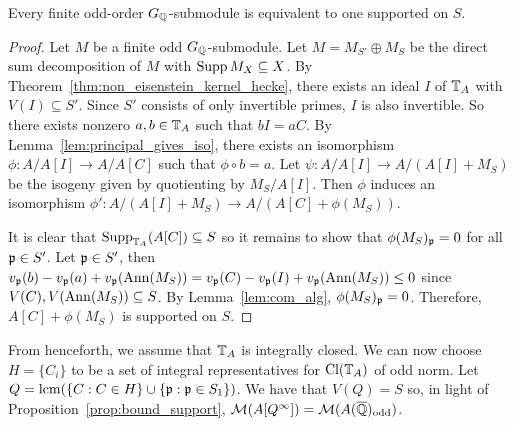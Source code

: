 \documentclass[thesis.tex]{subfiles}
\begin{document}
\begin{proposition}%
    \label{prop:bound_support}
    Every finite odd-order $G_{\mathbb{Q}}$-submodule is equivalent to one supported on
    $S$.
\end{proposition}
\begin{proof}
    Let $M$ be a finite odd $G_{\mathbb{Q}}$-submodule. Let $M=M_{S'}\oplus M_S$ be the
    direct sum decomposition of $M$ with $\operatorname{Supp} M_X \subseteq X$. By
    Theorem~\ref{thm:non_eisenstein_kernel_hecke}, there exists an ideal
    $I$ of $\mathbb{T}_A$ with $V(I)\subseteq S'$. Since $S'$ consists of only
    invertible primes, $I$ is also invertible. So there exists nonzero $a,b\in
    \mathbb{T}_A$ such that $bI=aC$. By Lemma~\ref{lem:principal_gives_iso}, there
    exists an isomorphism $\phi:A/A[I]\to A/A[C]$ such that $\phi\circ b = a$.
    Let $\psi:A/A[I]\to A/(A[I]+M_S)$ be the isogeny given by quotienting by
    $M_S/A[I]$. Then $\phi$ induces an isomorphism $\phi':A/(A[I]+M_S)\to
    A/(A[C]+\phi(M_S))$.

    It is clear that $\operatorname{Supp}_{\mathbb{T}_A}(A[C])\subseteq S$ so it remains to show
    that $\phi(M_S)_{\mathfrak{p}} =0$ for all $\mathfrak{p} \in S'$. Let $\mathfrak{p}\in S'$, then
    $v_{\mathfrak{p}}(b)-v_{\mathfrak{p}}(a)+v_{\mathfrak{p}}(\operatorname{Ann}(M_S))=v_{\mathfrak{p}}(C)-v_{\mathfrak{p}}(I)+v_{\mathfrak{p}}(\operatorname{Ann}(M_S)) \leq 0$
    since $V(C),V(\operatorname{Ann}(M_S))\subseteq S$. By Lemma~\ref{lem:com_alg},
    $\phi(M_S)_{\mathfrak{p}} = 0$. Therefore, $A[C]+\phi(M_S)$ is supported on $S$.
\end{proof}

From henceforth, we assume that $\mathbb{T}_A$ is integrally closed. We can now choose
$H=\{C_i\}$ to be a set of integral representatives for $\operatorname{Cl}(\mathbb{T}_A)$ of odd
norm. Let $Q=\operatorname{lcm}(\{C:C\in H\}\cup \{\mathfrak{p}:\mathfrak{p}\in S_1\})$. We have that $V(Q)=S$
so, in light of Proposition~\ref{prop:bound_support},
$\mathcal{M}(A[Q^\infty])=\mathcal{M}(A(\overline{\mathbb{Q}})_{\mathrm{odd}})$.
\end{document}
